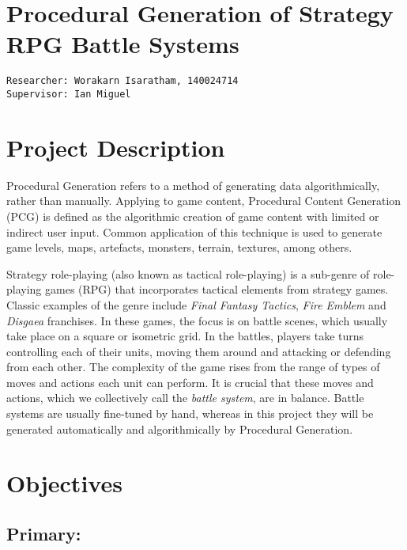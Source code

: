 \documentclass[a4paper,11pt]{article}
\begin{document}
	
\section*{Procedural Generation of Strategy RPG Battle Systems}

\begin{verbatim}
Researcher: Worakarn Isaratham, 140024714
Supervisor: Ian Miguel
\end{verbatim}
	
\section*{Project Description}

Procedural Generation refers to a method of generating data algorithmically, rather than manually. Applying to game content, Procedural Content Generation (PCG) is defined as the algorithmic creation of game content with limited or indirect user input\cite{pcgbook}. Common application of this technique is used to generate game levels, maps, artefacts, monsters, terrain, textures, among others.

Strategy role-playing (also known as tactical role-playing) is a sub-genre of role-playing games (RPG) that incorporates tactical elements from strategy games. Classic examples of the genre include \textit{Final Fantasy Tactics}, \textit{Fire Emblem} and \textit{Disgaea} franchises\cite{web-playingroles}. In these games, the focus is on battle scenes, which usually take place on a square or isometric grid. In the battles, players take turns controlling each of their units, moving them around and attacking or defending from each other. The complexity of the game rises from the range of types of moves and actions each unit can perform. It is crucial that these moves and actions, which we collectively call the \textit{battle system}, are in balance. Battle systems are usually fine-tuned by hand, whereas in this project they will be generated automatically and algorithmically by Procedural Generation.

\section*{Objectives}

\subsection*{Primary:}
\end{document}
